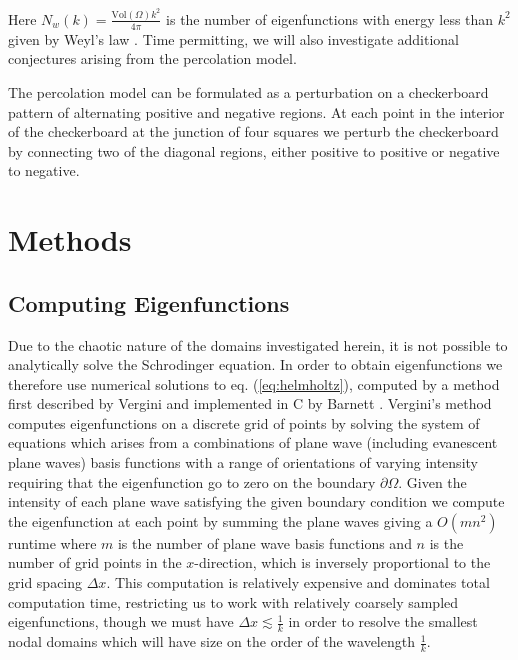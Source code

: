 \documentclass[english]{article}
\begin{document}
\begin{multicols}{2}
\noindent Here $N_{w}\left(k\right) = \frac{\text{Vol}\left(\Omega\right)k^{2}}{4\pi}$ is the number of eigenfunctions with energy less than $k^{2}$ given by Weyl's law \cite{nonnenmacher}. Time permitting, we will also investigate additional conjectures arising from the percolation model.

The percolation model can be formulated as a perturbation on a checkerboard pattern of alternating positive and negative regions. At each point in the interior of the checkerboard at the junction of four squares we perturb the checkerboard by connecting two of the diagonal regions, either positive to positive or negative to negative.

\section*{Methods}
\subsection*{Computing Eigenfunctions}
Due to the chaotic nature of the domains investigated herein, it is not possible to analytically solve the Schrodinger equation. In order to obtain eigenfunctions we therefore use numerical solutions to eq. (\ref{eq:helmholtz}), computed by a method first described by Vergini \cite{vergini} and implemented in C by Barnett \cite{barnett}. Vergini's method computes eigenfunctions on a discrete grid of points by solving the system of equations which arises from a combinations of plane wave (including evanescent plane waves) basis functions with a range of orientations of varying intensity requiring that the eigenfunction go to zero on the boundary $\partial\Omega$. Given the intensity of each plane wave satisfying the given boundary condition we compute the eigenfunction at each point by summing the plane waves giving a $O\left(mn^{2}\right)$ runtime where $m$ is the number of plane wave basis functions and $n$ is the number of grid points in the $x$-direction, which is inversely proportional to the grid spacing $\Delta x$. This computation is relatively expensive and dominates total computation time, restricting us to work with relatively coarsely sampled eigenfunctions, though we must have $\Delta x \lesssim \frac{1}{k}$ in order to resolve the smallest nodal domains which will have size on the order of the wavelength $\frac{1}{k}$.


\end{multicols}
\end{document}
